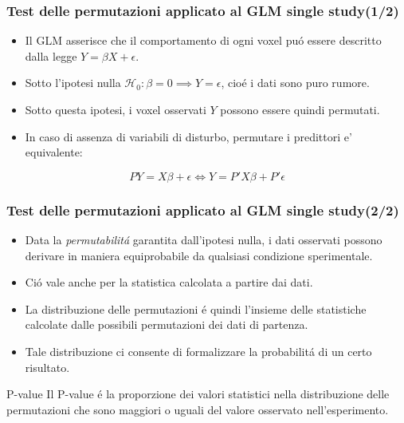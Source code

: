 \documentclass{beamer}
\begin{document}
\begin{frame}
\frametitle{Test delle permutazioni applicato al GLM single study(1/2)}
\begin{itemize}
\item {} Il GLM asserisce che il comportamento di ogni voxel pu\'o essere descritto dalla legge $Y = \beta X + \epsilon$.
\item {}Sotto l'ipotesi nulla $\mathcal{H}_0 : \beta = 0 \implies Y = \epsilon$, cio\'e i dati sono puro rumore.
\item {}Sotto questa ipotesi, i voxel osservati $Y$ possono essere quindi \alert{permutati}.
\item {} In caso di assenza di variabili di disturbo, permutare i predittori e' equivalente:
\end{itemize}
$$PY = X\beta + \epsilon \iff Y = P'X\beta + P'\epsilon$$
\end{frame}

\begin{frame}
\frametitle{Test delle permutazioni applicato al GLM single study(2/2)}
\begin{itemize}
\item {}Data la \emph{permutabilit\'a} garantita dall'ipotesi nulla, i dati osservati possono derivare in maniera equiprobabile da qualsiasi condizione sperimentale.
\item {}Ci\'o vale anche per la statistica calcolata a partire dai dati.
\item {}La \alert{distribuzione delle permutazioni} \'e quindi l'insieme delle statistiche calcolate dalle possibili permutazioni dei dati di partenza.
\item {}Tale distribuzione ci consente di formalizzare la probabilit\'a di un certo risultato.
\end{itemize}
\begin{block}{P-value}
Il P-value \'e la proporzione dei valori statistici nella distribuzione delle permutazioni che sono maggiori o uguali del valore osservato nell'esperimento.
\end{block}
\end{frame}
\end{document}
